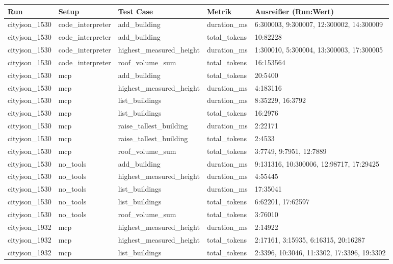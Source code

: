 \begin{table}[H]
\centering
\scriptsize
\begin{tabular}{l l l l l}
\toprule
Run & Setup & Test Case & Metrik & Ausreißer (Run:Wert) \\
\midrule
cityjson\_1530 & code\_interpreter & add\_building & duration\_ms & 6:300003, 9:300007, 12:300002, 14:300009 \\
cityjson\_1530 & code\_interpreter & add\_building & total\_tokens & 10:82228 \\
cityjson\_1530 & code\_interpreter & highest\_measured\_height & duration\_ms & 1:300010, 5:300004, 13:300003, 17:300005 \\
cityjson\_1530 & code\_interpreter & roof\_volume\_sum & total\_tokens & 16:153564 \\
cityjson\_1530 & mcp & add\_building & total\_tokens & 20:5400 \\
cityjson\_1530 & mcp & highest\_measured\_height & duration\_ms & 4:183116 \\
cityjson\_1530 & mcp & list\_buildings & duration\_ms & 8:35229, 16:3792 \\
cityjson\_1530 & mcp & list\_buildings & total\_tokens & 16:2976 \\
cityjson\_1530 & mcp & raise\_tallest\_building & duration\_ms & 2:22171 \\
cityjson\_1530 & mcp & raise\_tallest\_building & total\_tokens & 2:4533 \\
cityjson\_1530 & mcp & roof\_volume\_sum & total\_tokens & 3:7749, 9:7951, 12:7889 \\
cityjson\_1530 & no\_tools & add\_building & duration\_ms & 9:131316, 10:300006, 12:98717, 17:29425 \\
cityjson\_1530 & no\_tools & highest\_measured\_height & duration\_ms & 4:55445 \\
cityjson\_1530 & no\_tools & list\_buildings & duration\_ms & 17:35041 \\
cityjson\_1530 & no\_tools & list\_buildings & total\_tokens & 6:62201, 17:62597 \\
cityjson\_1530 & no\_tools & roof\_volume\_sum & total\_tokens & 3:76010 \\
cityjson\_1932 & mcp & highest\_measured\_height & duration\_ms & 2:14922 \\
cityjson\_1932 & mcp & highest\_measured\_height & total\_tokens & 2:17161, 3:15935, 6:16315, 20:16287 \\
cityjson\_1932 & mcp & list\_buildings & total\_tokens & 2:3396, 10:3046, 11:3302, 17:3396, 19:3302 \\

\end{tabular}
\end{table}
